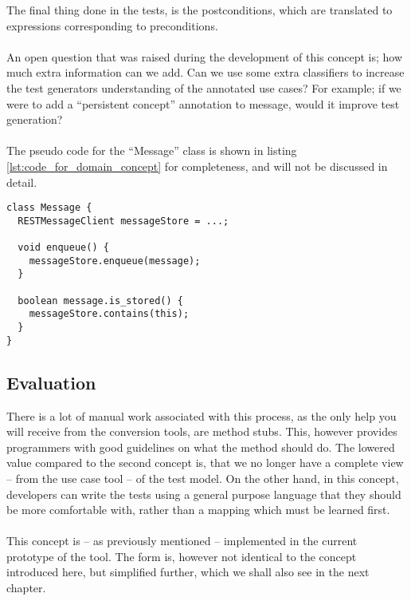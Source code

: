 The final thing done in the tests, is the postconditions, which are translated to expressions corresponding to preconditions.\\\\
An open question that was raised during the development of this concept is; how much extra information can we add. Can we use some extra classifiers to increase the test generators understanding of the annotated use cases? For example; if we were to add a ``persistent concept'' annotation to message, would it improve test generation?\\\\
The pseudo code for the ``Message'' class is shown in listing \ref{lst:code_for_domain_concept} for completeness, and will not be discussed in detail.
\begin{lstlisting}[style=Dart, caption=Pseudo code representing Message domain concept,label={lst:code_for_domain_concept}]
class Message {
  RESTMessageClient messageStore = ...;
  
  void enqueue() {
    messageStore.enqueue(message);
  }

  boolean message.is_stored() {
    messageStore.contains(this);
  }
}
\end{lstlisting}
\subsection{Evaluation}
There is a lot of manual work associated with this process, as the only help you will receive from the conversion tools, are method stubs. This, however provides programmers with good guidelines on what the method should do. The lowered value compared to the second concept is, that we no longer have a complete view -- from the use case tool -- of the test model. On the other hand, in this concept, developers can write the tests using a general purpose language that they should be more comfortable with, rather than a mapping which must be learned first.\\\\
This concept is -- as previously mentioned -- implemented in the current prototype of the tool. The form is, however not identical to the concept introduced here, but simplified further, which we shall also see in the next chapter.